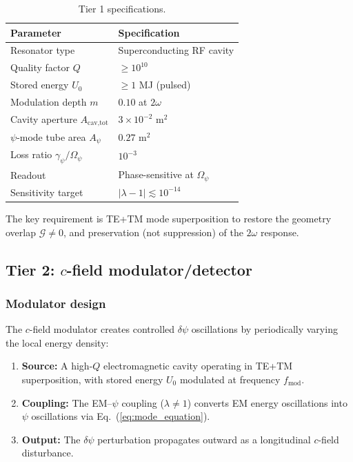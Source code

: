 \documentclass[aps,prd,twocolumn,superscriptaddress,nofootinbib,floatfix]{revtex4-2}
\newcommand{\psifield}{\psi}
\newcommand{\calG}{\mathcal{G}}
\newcommand{\ee}[1]{\times 10^{#1}}
\begin{document}
\begin{table}[h]
\caption{Tier 1 specifications.}
\label{tab:tier1_specs}
\begin{ruledtabular}
\begin{tabular}{ll}
Parameter & Specification \\
\hline
Resonator type & Superconducting RF cavity \\
Quality factor $Q$ & $\geq 10^{10}$ \\
Stored energy $U_0$ & $\geq 1$ MJ (pulsed) \\
Modulation depth $m$ & $0.10$ at $2\omega$ \\
Cavity aperture $A_{\text{cav,tot}}$ & $3\ee{-2}$ m$^2$ \\
$\psifield$-mode tube area $A_\psi$ & $0.27$ m$^2$ \\
Loss ratio $\gamma_\psi/\Omega_\psi$ & $10^{-3}$ \\
Readout & Phase-sensitive at $\Omega_\psi$ \\
Sensitivity target & $|\lambda-1| \lesssim 10^{-14}$ \\
\end{tabular}
\end{ruledtabular}
\end{table}

The key requirement is TE+TM mode superposition to restore the
geometry overlap $\calG \neq 0$, and preservation (not
suppression) of the $2\omega$ response.

\subsection{Tier 2: $c$-field modulator/detector}
\label{subsec:tier2}

\subsubsection{Modulator design}

The $c$-field modulator creates controlled $\delta\psifield$
oscillations by periodically varying the local energy density:

\begin{enumerate}
\item \textbf{Source:} A high-$Q$ electromagnetic cavity
operating in TE+TM superposition, with stored energy $U_0$
modulated at frequency $f_{\text{mod}}$.

\item \textbf{Coupling:} The EM--$\psifield$ coupling
($\lambda \neq 1$) converts EM energy oscillations into
$\psifield$ oscillations via Eq.~(\ref{eq:mode_equation}).

\item \textbf{Output:} The $\delta\psifield$ perturbation
propagates outward as a longitudinal $c$-field disturbance.
\end{enumerate}
\end{document}
